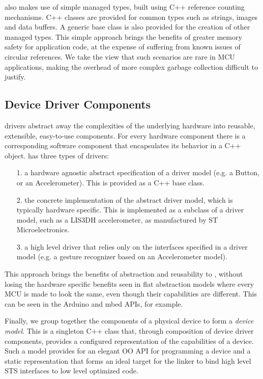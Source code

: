 \CO also makes use of simple managed types, built using C++ reference counting mechanisms. C++ classes are provided for common types such as strings, images and data buffers. A generic base class is also provided for the creation of other managed types. This simple approach brings the benefits of greater memory safety for application code, at the expense of suffering from known issues of circular references. We take the view that such scenarios are rare in MCU applications, making the overhead of more complex garbage collection difficult to justify.

\subsection{Device Driver Components}
\CO drivers abstract away the complexities of the underlying hardware into reusable, extensible, easy-to-use components. For every hardware component there is a corresponding software component that encapsulates its behavior in a C++ object. \CO has three types of drivers:
\begin{itemize}
    \item[1.] a hardware agnostic abstract specification of a driver model (e.g. a Button, or an Accelerometer). This is provided as a C++ base class.
    \item[2.] the concrete implementation of the abstract driver model, which is typically hardware specific. This is implemented as a subclass of a driver model, such as a LIS3DH accelerometer, as manufactured by ST Microelectronics.
    \item[3.] a high level driver that relies only on the interfaces specified in a driver model (e.g. a gesture recognizer based on an Accelerometer model).
\end{itemize}

This approach brings the benefits of abstraction and re\-usability to \CON, without losing the hardware specific benefits seen in flat abstraction models where every MCU is made to look the same, even though their capabilities are different. This can be seen in the Arduino and mbed APIs, for example.

Finally, we group together the components of a physical device to form a \emph{device model}. This is a singleton C++ class that, through composition of device driver components, provides a configured representation of the capabilities of a device. Such a model provides for an elegant OO API for programming a device and a static representation that forms an ideal target for the \MC linker to bind high level STS interfaces to low level optimized code.

